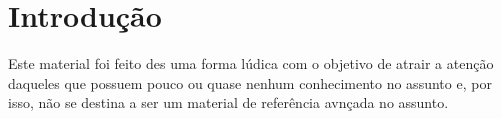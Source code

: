 \chapter{Introdução}

Este material foi feito des uma forma lúdica com o objetivo de atrair a atenção daqueles que possuem pouco ou quase nenhum conhecimento no assunto e, por isso, não se destina a ser um material de referência avnçada no assunto.